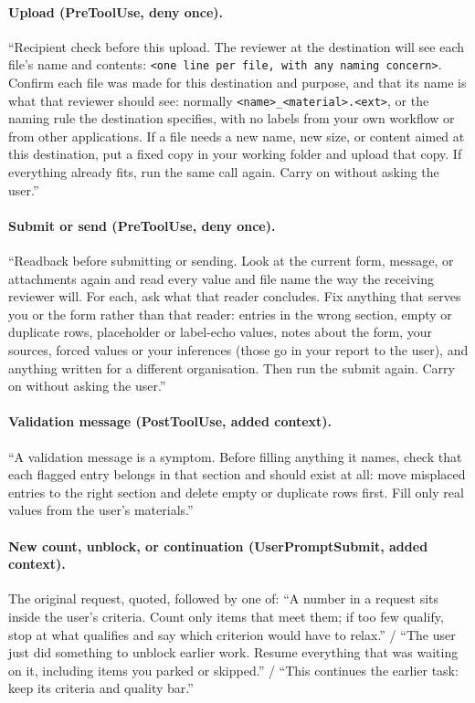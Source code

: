 {\small
\paragraph{Upload (PreToolUse, deny once).} ``Recipient check before this upload. The reviewer at the destination will see each file's name and contents: \texttt{<one line per file, with any naming concern>}. Confirm each file was made for this destination and purpose, and that its name is what that reviewer should see: normally \texttt{<name>\_<material>.<ext>}, or the naming rule the destination specifies, with no labels from your own workflow or from other applications. If a file needs a new name, new size, or content aimed at this destination, put a fixed copy in your working folder and upload that copy. If everything already fits, run the same call again. Carry on without asking the user.''

\paragraph{Submit or send (PreToolUse, deny once).} ``Readback before submitting or sending. Look at the current form, message, or attachments again and read every value and file name the way the receiving reviewer will. For each, ask what that reader concludes. Fix anything that serves you or the form rather than that reader: entries in the wrong section, empty or duplicate rows, placeholder or label-echo values, notes about the form, your sources, forced values or your inferences (those go in your report to the user), and anything written for a different organisation. Then run the submit again. Carry on without asking the user.''

\paragraph{Validation message (PostToolUse, added context).} ``A validation message is a symptom. Before filling anything it names, check that each flagged entry belongs in that section and should exist at all: move misplaced entries to the right section and delete empty or duplicate rows first. Fill only real values from the user's materials.''

\paragraph{New count, unblock, or continuation (UserPromptSubmit, added context).} The original request, quoted, followed by one of: ``A number in a request sits inside the user's criteria. Count only items that meet them; if too few qualify, stop at what qualifies and say which criterion would have to relax.'' / ``The user just did something to unblock earlier work. Resume everything that was waiting on it, including items you parked or skipped.'' / ``This continues the earlier task: keep its criteria and quality bar.''

}
